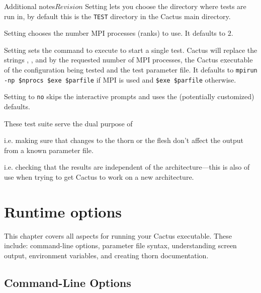 \begin{cactuspart}{Additional notes}{}{$Revision$}
Setting  lets you choose the directory where tests are run
in, by default this is the \texttt{TEST} directory in the Cactus main
directory.

Setting  chooses the number MPI
processes (ranks) to use. It defaults to $2$.

Setting  sets the command to execute to
start a single test. Cactus will replace the strings ,
, and  by the requested number of MPI processes,
the Cactus executable of the configuration being tested and the test
parameter file. It defaults to \texttt{mpirun -np \$nprocs \$exe \$parfile}
if MPI is used and \texttt{\$exe \$parfile} otherwise.

Setting  to \texttt{no} skips the interactive prompts and uses
the (potentially customized) defaults.

These test suite serve the dual purpose of

\begin{Lentry}
\item [Regression testing]
i.e. making sure that changes to the thorn or the flesh don't affect the
output from a known parameter file.
\item [Portability testing]
i.e. checking that the results are independent of the architecture---this
is also of use when trying to get Cactus to work on a new architecture.
\end{Lentry}


\chapter{Runtime options}

This chapter covers all aspects for running your
Cactus executable.  These include: command-line options, parameter
file syntax, understanding screen output, environment variables, and
creating thorn documentation.

\section{Command-Line Options}
\label{sec:command_line_options}


\end{cactuspart}
